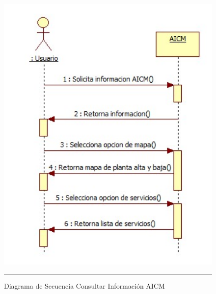 \begin{figure}[H]
	\centering
		\includegraphics[width=1\textwidth]{Figuras/ConsultarAICM.jpg}
		\rule{30em}{0.5pt}
	\caption[Diagrama de Secuencia Consultar Información AICM]{Diagrama de Secuencia Consultar Información AICM}
	\label{fig:secConsultarInformacionAICM}
\end{figure}

